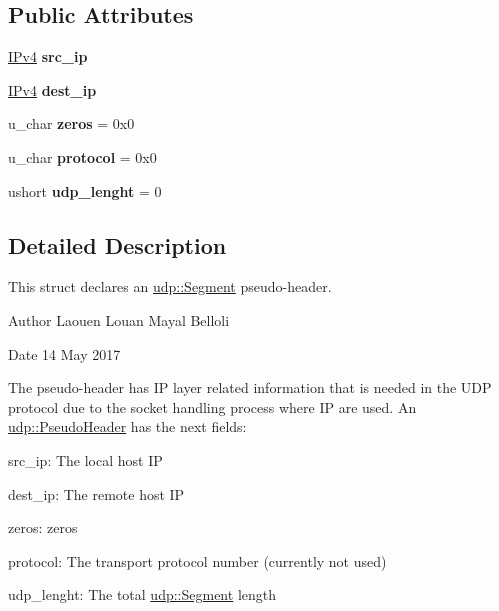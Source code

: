 \subsection*{Public Attributes}
\begin{DoxyCompactItemize}
\item 
\hyperlink{structIPv4}{I\+Pv4} {\bfseries src\+\_\+ip}\hypertarget{structudp_1_1PseudoHeader_aafc5eb8cfafb7ce922e1678c359f55bb}{}\label{structudp_1_1PseudoHeader_aafc5eb8cfafb7ce922e1678c359f55bb}

\item 
\hyperlink{structIPv4}{I\+Pv4} {\bfseries dest\+\_\+ip}\hypertarget{structudp_1_1PseudoHeader_abebb8b9c17774287930affd0c3c471a8}{}\label{structudp_1_1PseudoHeader_abebb8b9c17774287930affd0c3c471a8}

\item 
u\+\_\+char {\bfseries zeros} = 0x0\hypertarget{structudp_1_1PseudoHeader_a51cdc408b4e23b6d8dc3d835dcef9291}{}\label{structudp_1_1PseudoHeader_a51cdc408b4e23b6d8dc3d835dcef9291}

\item 
u\+\_\+char {\bfseries protocol} = 0x0\hypertarget{structudp_1_1PseudoHeader_adcacf0d1e8481cd171121f3668f7c240}{}\label{structudp_1_1PseudoHeader_adcacf0d1e8481cd171121f3668f7c240}

\item 
ushort {\bfseries udp\+\_\+lenght} = 0\hypertarget{structudp_1_1PseudoHeader_adc2636cd18c48abaadc658453ff1b019}{}\label{structudp_1_1PseudoHeader_adc2636cd18c48abaadc658453ff1b019}

\end{DoxyCompactItemize}


\subsection{Detailed Description}
This struct declares an \hyperlink{structudp_1_1Segment}{udp\+::\+Segment} pseudo-\/header. 

\begin{DoxyAuthor}{Author}
Laouen Louan Mayal Belloli 
\end{DoxyAuthor}
\begin{DoxyDate}{Date}
14 May 2017
\end{DoxyDate}
The pseudo-\/header has IP layer related information that is needed in the U\+DP protocol due to the socket handling process where IP are used. An \hyperlink{structudp_1_1PseudoHeader}{udp\+::\+Pseudo\+Header} has the next fields\+:
\begin{DoxyEnumerate}
\item src\+\_\+ip\+: The local host IP
\item dest\+\_\+ip\+: The remote host IP
\item zeros\+: zeros
\item protocol\+: The transport protocol number (currently not used)
\item udp\+\_\+lenght\+: The total \hyperlink{structudp_1_1Segment}{udp\+::\+Segment} length 
\end{DoxyEnumerate}

